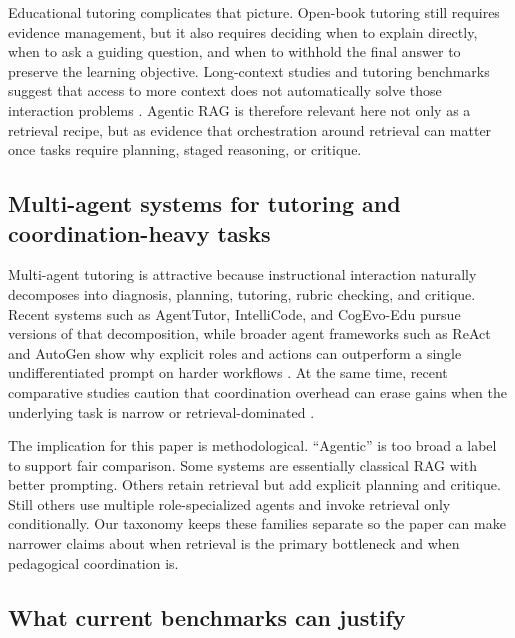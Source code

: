Educational tutoring complicates that picture. Open-book tutoring still requires evidence management, but it also requires deciding when to explain directly, when to ask a guiding question, and when to withhold the final answer to preserve the learning objective. Long-context studies and tutoring benchmarks suggest that access to more context does not automatically solve those interaction problems \cite{liu2024lostmiddle,bai2024longbench2,chevalier2024sciencetutors}. Agentic RAG is therefore relevant here not only as a retrieval recipe, but as evidence that orchestration around retrieval can matter once tasks require planning, staged reasoning, or critique.

\subsection{Multi-agent systems for tutoring and coordination-heavy tasks}

Multi-agent tutoring is attractive because instructional interaction naturally decomposes into diagnosis, planning, tutoring, rubric checking, and critique. Recent systems such as AgentTutor, IntelliCode, and CogEvo-Edu pursue versions of that decomposition, while broader agent frameworks such as ReAct and AutoGen show why explicit roles and actions can outperform a single undifferentiated prompt on harder workflows \cite{liu2026agenttutor,jones2026intellicode,wu2025cogevoedu,yao2023react,wu2024autogen}. At the same time, recent comparative studies caution that coordination overhead can erase gains when the underlying task is narrow or retrieval-dominated \cite{nguyen2025marag,radeva2025coordination}.

The implication for this paper is methodological. ``Agentic'' is too broad a label to support fair comparison. Some systems are essentially classical RAG with better prompting. Others retain retrieval but add explicit planning and critique. Still others use multiple role-specialized agents and invoke retrieval only conditionally. Our taxonomy keeps these families separate so the paper can make narrower claims about when retrieval is the primary bottleneck and when pedagogical coordination is.

\subsection{What current benchmarks can justify}

